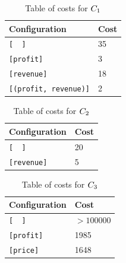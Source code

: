 \begin{example}
\begin{table}[!ht]
        \centering
        \caption{Table of costs for $C_1$}
        \def\arraystretch{1.25}
        \begin{tabular}{ll}
            \toprule
            \textbf{Configuration} & \textbf{Cost}   \\
            \midrule
            \texttt{[ \ ]} & 35 \\
            \texttt{[profit]} & 3  \\
            \texttt{[revenue]} & 18  \\
            \texttt{[(profit, revenue)]} & 2  \\
            \bottomrule
        \end{tabular}
    \end{table}
    \begin{table}[!ht]
        \centering
        \caption{Table of costs for $C_2$}
        \def\arraystretch{1.20}
        \begin{tabular}{ll}
            \toprule
            \textbf{Configuration} & \textbf{Cost}   \\
            \midrule
            \texttt{[ \ ]} & 20 \\
            \texttt{[revenue]} & 5  \\
            \bottomrule
        \end{tabular}
    \end{table}
    \begin{table}[!ht]
        \centering
        \caption{Table of costs for $C_3$}
        \def\arraystretch{1.20}
        \begin{tabular}{ll}
            \toprule
            \textbf{Configuration} & \textbf{Cost}   \\
            \midrule
            \texttt{[ \ ]} & $>100000$ \\
            \texttt{[profit]} & 1985 \\
            \texttt{[price]} & 1648  \\

\end{tabular}
\end{table}
\end{example}
